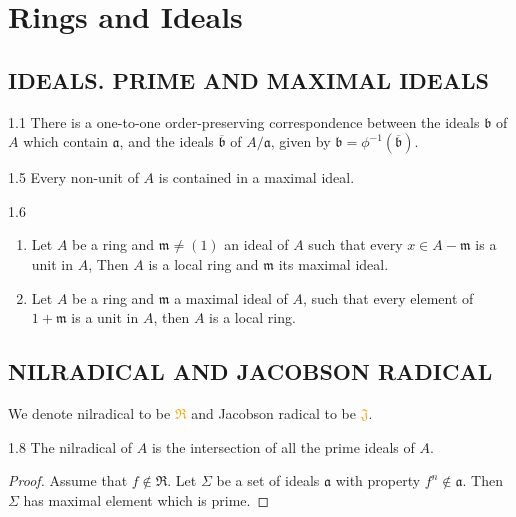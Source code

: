 \chapter{Rings and Ideals}

\section*{IDEALS. PRIME AND MAXIMAL IDEALS}

\begin{proposition}{1.1}
	There is a one-to-one order-preserving correspondence between the ideals $\mathfrak{b}$ of $A$ which contain $\mathfrak{a}$, and the ideals $\overline{\mathfrak{b}}$ of $A/\mathfrak{a}$, given by $\mathfrak{b}=\phi^{-1}\left(\overline{\mathfrak{b}}\right)$.
\end{proposition}

\begin{corollary}{1.5}
	Every non-unit of $A$ is contained in a maximal ideal.
\end{corollary}

\begin{corollary}{1.6}
	\begin{enumerate}[label=\textup{(\roman*)},ref=\thecorollarytemp(\roman*)]
		\item\label{1.6.1} Let $A$ be a ring and $\mathfrak{m}\neq(1)$ an ideal of $A$ such that every $x\in A-\mathfrak{m}$ is a unit in $A$, Then $A$ is a local ring and $\mathfrak{m}$ its maximal ideal.
		\item Let $A$ be a ring and $\mathfrak{m}$ a maximal ideal of $A$, such that every element of $1+\mathfrak{m}$ is a unit in $A$, then $A$ is a local ring.
	\end{enumerate}
\end{corollary}

\section*{NILRADICAL AND JACOBSON RADICAL}

We denote nilradical to be \textcolor{orange}{$\mathfrak{R}$} and Jacobson radical to be \textcolor{orange}{$\mathfrak{J}$}.

\begin{proposition}{1.8}
	The nilradical of $A$ is the intersection of all the prime ideals of $A$.
	\begin{proof}
		Assume that $f\notin\mathfrak{R}$. Let $\Sigma$ be a set of ideals $\mathfrak{a}$ with property $f^n\notin\mathfrak{a}$. Then $\Sigma$ has maximal element which is prime.
	\end{proof}
\end{proposition}

